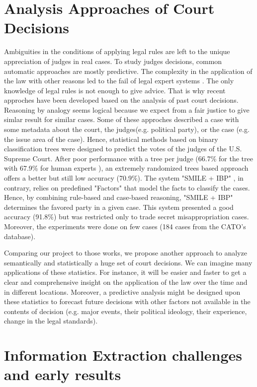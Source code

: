 \documentclass[runningheads,a4paper]{llncs}
\begin{document}
\section{Analysis Approaches of Court Decisions}

Ambiguities in the conditions of applying legal rules are left to the unique appreciation of judges in real cases. To study judges decisions, common automatic approaches are mostly predictive. The complexity in the application of the law with other reasons led to the fail of legal expert systems \cite{leith2010risefall}. The only knowledge of legal rules is not enough to give advice. That is why recent approches have been developed based on the analysis of past court decisions. Reasoning by analogy seems logical because we expect from a fair justice to give simlar result for similar cases. Some of these approches described a case with some metadata about the court, the judges(e.g. political party), or the case (e.g. the issue area of the case). Hence, statistical methods based on binary classification trees were designed to predict the votes of the judges of the U.S. Supreme Court. After poor performance with a tree per judge (66.7\% for the tree with 67.9\% for human experts \cite{martin2004competing}), an extremely randomized trees based approach \cite{katz2014predicting} offers a better but still low accuracy (70.9\%). The system "SMILE + IBP" \cite{Ashley2009}, in contrary, relies on predefined "Factors" that model the facts to classify the cases. Hence, by combining rule-based and case-based reasoning, "SMILE + IBP" determines the favored party in a given case. This system presented a good accuracy (91.8\%) but was restricted only to trade secret misappropriation cases. Moreover, the experiments were done on few cases (184 cases from the CATO's database).

Comparing our project to those works, we propose another approach to analyze semantically and statistically a huge set of court decisions. We can imagine many applications of these statistics. For instance, it will be easier and faster to get a clear and comprehensive insight on the application of the law over the time and in different locations. Moreover, a predictive analysis might be designed upon these statistics to forecast future decisions with other factors not available in the contents of decision (e.g. major events, their political ideology, their experience, change in the legal standards). 

\section{Information Extraction challenges and early results}
\end{document}
